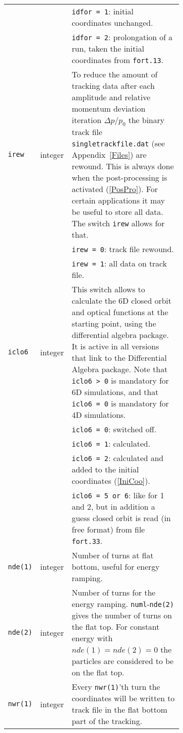\begin{longtabu}{@{}llp{0.7\linewidth}}
                           &          & \texttt{idfor = 1}: initial coordinates unchanged. \\
                           &          & \texttt{idfor = 2}: prolongation of a run, taken the initial coordinates from \texttt{fort.13}. \\
    \texttt{irew}          & integer  & To reduce the amount of tracking data after each amplitude and relative momentum deviation iteration $\Delta p/p_0$ the binary track file \texttt{singletrackfile.dat} (see Appendix~\ref{Files}) are rewound. This is always done when the post-processing is activated (\ref{PosPro}). For certain applications it may be useful to store all data. The switch \texttt{irew} allows for that. \\
                           &          & \texttt{irew = 0}: track file rewound. \\
                           &          & \texttt{irew = 1}: all data on track file. \\
    \texttt{iclo6}         & integer  & This switch allows to calculate the 6D closed orbit and optical functions at the starting point, using the differential algebra package. It is active in all versions that link to the Differential Algebra package.  Note that \texttt{iclo6 > 0} is mandatory for 6D simulations, and that \texttt{iclo6 = 0} is mandatory for 4D simulations. \\
                           &          & \texttt{iclo6 = 0}: switched off. \\
                           &          & \texttt{iclo6 = 1}: calculated. \\
                           &          & \texttt{iclo6 = 2}: calculated and added to the initial coordinates (\ref{IniCoo}). \\
                           &          & \texttt{iclo6 = 5 or 6}: like for 1 and 2, but in addition a guess closed orbit is read (in free format) from file \texttt{fort.33}. \\
    \texttt{nde(1)}        & integer  & Number of turns at flat bottom, useful for energy ramping. \\
    \texttt{nde(2)}        & integer  & Number of turns for the energy ramping. \texttt{numl}-\texttt{nde(2)} gives the number of turns on the flat top. For constant energy with \mbox{$nde(1) = nde(2) = 0$} the particles are considered to be on the flat top. \\
    \texttt{nwr(1)}        & integer  & Every \texttt{nwr(1)}'th turn the coordinates will be written to track file in the flat bottom part of the tracking. \\

\end{longtabu}
